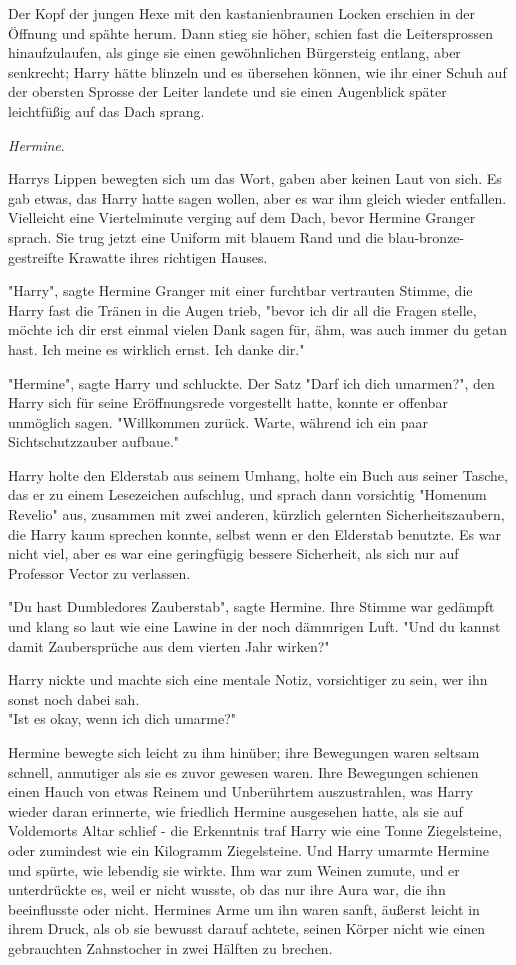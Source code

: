 {Der Kopf der jungen Hexe mit den kastanienbraunen Locken erschien in der Öffnung und spähte herum. Dann stieg sie höher, schien fast die Leitersprossen hinaufzulaufen, als ginge sie einen gewöhnlichen Bürgersteig entlang, aber senkrecht; Harry hätte blinzeln und es übersehen können, wie ihr einer Schuh auf der obersten Sprosse der Leiter landete und sie einen Augenblick später leichtfüßig auf das Dach sprang.

\emph{Hermine}.

Harrys Lippen bewegten sich um das Wort, gaben aber keinen Laut von sich. Es gab etwas, das Harry hatte sagen wollen, aber es war ihm gleich wieder entfallen. Vielleicht eine Viertelminute verging auf dem Dach, bevor Hermine Granger sprach. Sie trug jetzt eine Uniform mit blauem Rand und die blau-bronze-gestreifte Krawatte ihres richtigen Hauses.

"Harry", sagte Hermine Granger mit einer furchtbar vertrauten Stimme, die Harry fast die Tränen in die Augen trieb, "bevor ich dir all die Fragen stelle, möchte ich dir erst einmal vielen Dank sagen für, ähm, was auch immer du getan hast. Ich meine es wirklich ernst. Ich danke dir."

"Hermine", sagte Harry und schluckte. Der Satz "Darf ich dich umarmen?", den Harry sich für seine Eröffnungsrede vorgestellt hatte, konnte er offenbar unmöglich sagen. "Willkommen zurück. Warte, während ich ein paar Sichtschutzzauber aufbaue."

Harry holte den Elderstab aus seinem Umhang, holte ein Buch aus seiner Tasche, das er zu einem Lesezeichen aufschlug, und sprach dann vorsichtig "Homenum Revelio" aus, zusammen mit zwei anderen, kürzlich gelernten Sicherheitszaubern, die Harry kaum sprechen konnte, selbst wenn er den Elderstab benutzte. Es war nicht viel, aber es war eine geringfügig bessere Sicherheit, als sich nur auf Professor Vector zu verlassen.

"Du hast Dumbledores Zauberstab", sagte Hermine. Ihre Stimme war gedämpft und klang so laut wie eine Lawine in der noch dämmrigen Luft. "Und du kannst damit Zaubersprüche aus dem vierten Jahr wirken?"

Harry nickte und machte sich eine mentale Notiz, vorsichtiger zu sein, wer ihn sonst noch dabei sah.\\ "Ist es okay, wenn ich dich umarme?"

Hermine bewegte sich leicht zu ihm hinüber; ihre Bewegungen waren seltsam schnell, anmutiger als sie es zuvor gewesen waren. Ihre Bewegungen schienen einen Hauch von etwas Reinem und Unberührtem auszustrahlen, was Harry wieder daran erinnerte, wie friedlich Hermine ausgesehen hatte, als sie auf Voldemorts Altar schlief - die Erkenntnis traf Harry wie eine Tonne Ziegelsteine, oder zumindest wie ein Kilogramm Ziegelsteine. Und Harry umarmte Hermine und spürte, wie lebendig sie wirkte. Ihm war zum Weinen zumute, und er unterdrückte es, weil er nicht wusste, ob das nur ihre Aura war, die ihn beeinflusste oder nicht. Hermines Arme um ihn waren sanft, äußerst leicht in ihrem Druck, als ob sie bewusst darauf achtete, seinen Körper nicht wie einen gebrauchten Zahnstocher in zwei Hälften zu brechen.

}
